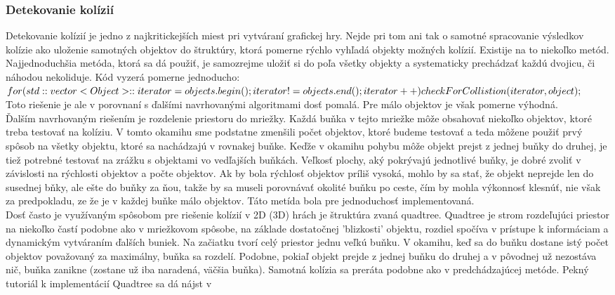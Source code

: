 \subsubsection{Detekovanie kolízií}%
Detekovanie kolízií je jedno z najkritickejších miest pri vytváraní grafickej hry. Nejde pri tom ani tak o samotné spracovanie výsledkov kolízie ako uloženie samotných objektov do štruktúry, ktorá pomerne rýchlo vyhľadá objekty možných kolízií. Existije na to niekoľko metód.\\
Najjednoduchšia metóda, ktorá sa dá použiť, je samozrejme uložiť si do poľa všetky objekty a systematicky prechádzať každú dvojicu, či náhodou nekoliduje. Kód vyzerá pomerne jednoducho:\\ $ for(std::vector<Object>::iterator = objects.begin();\\ iterator!=objects.end();\\ iterator++)\\ \\ checkForCollistion(iterator, object);$\\
Toto riešenie je ale v porovnaní s ďalšími navrhovanými algoritmami dosť pomalá. Pre málo objektov je však pomerne výhodná.\\
Ďalším navrhovaným riešením je rozdelenie priestoru do mriežky. Každá buňka v tejto mriežke môže obsahovať niekoľko objektov, ktoré treba testovať na kolíziu. V tomto okamihu sme podstatne zmenšili počet objektov, ktoré budeme testovať a teda môžene použiť prvý spôsob na všetky objektu, ktoré sa nachádzajú v rovnakej buňke. Keďže v okamihu pohybu môže objekt prejst z jednej buňky do druhej, je tiež potrebné testovať na zrážku s objektami vo vedľajších buňkách. Veľkosť plochy, aký pokrývajú jednotlivé buňky, je dobré zvoliť v závislosti na rýchlosti objektov a počte objektov. Ak by bola rýchlosť objektov príliš vysoká, mohlo by sa stať, že objekt neprejde len do susednej bňky, ale ešte do buňky za ňou, takže by sa museli porovnávať okolité buňku po ceste, čím by mohla výkonnosť klesnúť, nie však za predpokladu, ze že je v každej buňke málo objektov. Táto metída bola pre jednoduchosť implementovaná.\\%
Dosť často je využívaným spôsobom pre riešenie kolízií v 2D (3D) hrách je štruktúra zvaná quadtree. Quadtree je strom rozdeľujúci priestor na niekoľko častí podobne ako v mriežkovom spôsobe, na základe dostatočnej 'blizkosti' objektu, rozdiel spočíva v prístupe k informáciam a dynamickým vytváraním ďalších buniek. Na začiatku tvorí celý priestor jednu veľkú buňku. V okamihu, keď sa do buňku dostane istý počet objektov považovaný za maximálny, buňka sa rozdelí. Podobne, pokiaľ objekt prejde z jednej buňku do druhej a v pôvodnej už nezostáva nič, buňka zanikne (zostane už iba naradená, väčšia buňka). Samotná kolízia sa preráta podobne ako v predchádzajúcej metóde. Pekný tutoriál k implementácií Quadtree sa dá  nájst v \cite{quadtree}
